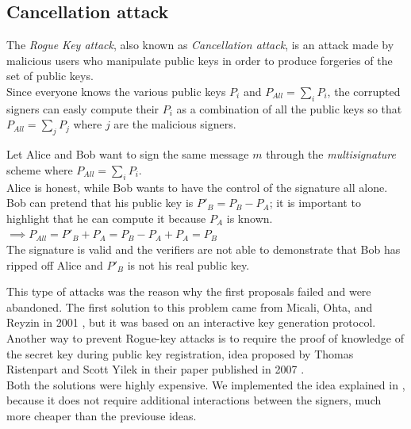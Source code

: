 \subsection{Cancellation attack}
The \textit{Rogue Key attack}, also known as \textit{Cancellation attack}, is an attack made by malicious users who manipulate public keys in order to produce forgeries of the set of public keys.\\
Since everyone knows the various public keys $P_{i}$ and $P_{All}=\sum_{i} P_{i}$, the corrupted signers can easly compute their $P_{i}$ as a combination of all the public keys so that $P_{All}=\sum_{j} P_{j}$ where $j$ are the malicious signers.
\begin{example}
	Let Alice and Bob want to sign the same message $m$ through the \textit{multisignature} scheme where $P_{All}=\sum_{i} P_{i}$.\\
	Alice is honest, while Bob wants to have the control of the signature all alone.\\
	Bob can pretend that his public key is $P'_{B}=P_{B}-P_{A}$; it is important to highlight that he can compute it because $P_{A}$ is known. \\
	$\implies P_{All}=P'_{B}+P_{A}=P_{B}-P_{A}+P_{A}=P_{B}$\\
	The signature is valid and the verifiers are not able to demonstrate that Bob has ripped off Alice and $P'_{B}$ is not his real public key.
\end{example}
This type of attacks was the reason why the first proposals failed and were abandoned. The first solution to this problem came from Micali, Ohta, and Reyzin in 2001 \cite{MOR}, but it was based on an interactive key generation protocol.\\
Another way to prevent Rogue-key attacks is to require the proof of knowledge of the secret key during public key registration, idea proposed by Thomas Ristenpart and Scott Yilek in their paper published in 2007 \cite{RY}.\\
Both the solutions were highly expensive. We implemented the idea explained in \cite{MuSig}, because it does not require additional interactions between the signers, much more cheaper than the previouse ideas.
